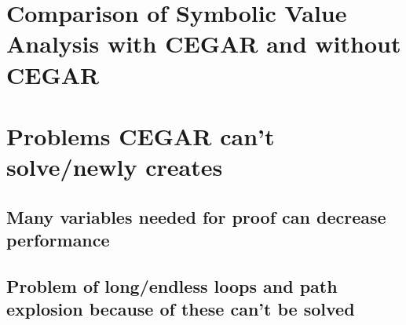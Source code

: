 \section{Comparison of Symbolic Value Analysis with CEGAR and without CEGAR}
\section{Problems CEGAR can't solve/newly creates}
\subsection{Many variables needed for proof can decrease performance}
\subsection{Problem of long/endless loops and path explosion because of these can't be solved}
